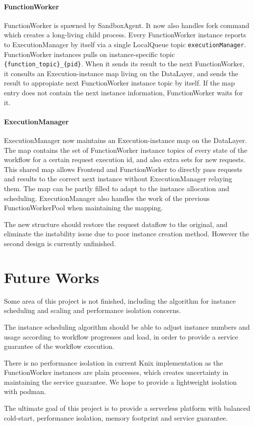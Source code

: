 \documentclass[conference]{IEEEtran}
\begin{document}
\paragraph{FunctionWorker}
FunctionWorker is spawned by SandboxAgent. It now also handles fork command which creates a long-living child process. Every FunctionWorker instance reports to ExecutionManager by itself via a single LocalQueue topic \verb|executionManager|. FunctionWorker instances pulls on instance-specific topic \verb|{function_topic}_{pid}|. When it sends its result to the next FunctionWorker, it consults an Execution-instance map living on the DataLayer, and sends the result to appropiate next FunctionWorker instance topic by itself. If the map entry does not contain the next instance information, FunctionWorker waits for it.

\paragraph{ExecutionManager}
ExecutionManager now maintains an Execution-instance map on the DataLayer. The map contains the set of FunctionWorker instance topics of every state of the workflow for a certain request execution id, and also extra sets for new requests. This shared map allows Frontend and FunctionWorker to directly pass requests and results to the correct next instance without ExecutionManager relaying them. The map can be partly filled to adapt to the instance allocation and scheduling. ExecutionManager also handles the work of the previous FunctionWorkerPool when maintaining the mapping.

The new structure should restore the request dataflow to the original, and eliminate the instability issue due to poor instance creation method. However the second design is currently unfinished.

\section{Future Works}
Some area of this project is not finished, including the algorithm for instance scheduling and scaling and performance isolation concerns. 

The instance scheduling algorithm should be able to adjust instance numbers and usage according to workflow progresses and load, in order to provide a service guarantee of the workflow execution. 

There is no performance isolation in current Knix implementation as the FunctionWorker instances are plain processes, which creates uncertainty in maintaining the service guarantee. We hope to provide a lightweight isolation with podman.

The ultimate goal of this project is to provide a serverless platform with balanced cold-start, performance isolation, memory footprint and service guarantee.



\end{document}
